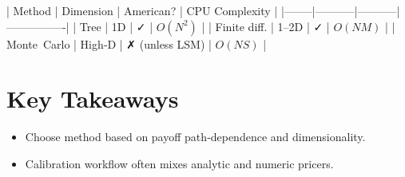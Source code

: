 | Method | Dimension | American? | CPU Complexity |
|--------|-----------|-----------|----------------|
| Tree            | 1D | ✓ | \(O(N^2)\) |
| Finite diff.    | 1–2D | ✓ | \(O(NM)\) |
| Monte Carlo     | High‑D | ✗ (unless LSM) | \(O(NS)\) |

\section*{Key Takeaways}
\begin{itemize}
  \item Choose method based on payoff path‑dependence and dimensionality.
  \item Calibration workflow often mixes analytic and numeric pricers.
\end{itemize}
